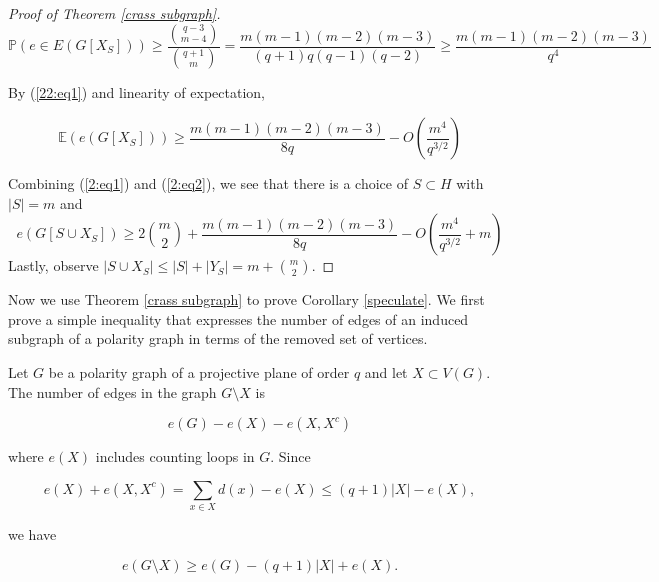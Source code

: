 \documentclass[12pt]{article}
\begin{document}
\begin{proof}[Proof of Theorem \ref{crass subgraph}]
    $$ \mathbb{P} ( e \in E (G[  X_S ] ) ) \geq \frac{ \binom{q-3}{m-4} }{ \binom{q+1}{m}} = \frac{ m ( m - 1) ( m - 2)( m - 3) }{ (q + 1) q ( q - 1) ( q- 2) } \geq \frac{ m ( m -1) ( m -2) ( m - 3) }{q^4} $$

    By (\ref{22:eq1}) and linearity of expectation,

    \begin{equation}\label{2:eq2}
        \mathbb{E} ( e (G [ X_S] ) ) \geq \frac{ m ( m - 1)(m-2)(m-3) }{8q} - O \left( \frac{m^4}{q^{3/2}} \right)
    \end{equation}

    Combining (\ref{2:eq1}) and (\ref{2:eq2}), we see that there is a choice of $S \subset H$ with $|S| = m$ and
    $$ e ( G[ S \cup X_S ] ) \geq 2 \binom{ m }{2} + \frac{ m ( m - 1)(m-2)(m-3) }{8q} - O \left( \frac{m^4}{q^{3/2}}+m \right) $$
    Lastly, observe $|S \cup X_S| \leq |S| + |Y_S| = m + \binom{m}{2}$.
\end{proof}

Now we use Theorem \ref{crass subgraph} to prove Corollary \ref{speculate}.  We first prove a simple inequality that
expresses the number of edges of an induced subgraph of a polarity graph in terms of the removed set of vertices.

Let $G$ be a polarity graph of a projective plane of order $q$ and let $X\subset V(G)$.
The number of edges in the graph $G \setminus X$ is

$$ e(G) - e(X) - e(X, X^c) $$

where $e(X)$ includes counting loops in $G$. Since

$$ e(X) + e(X, X^c) = \sum_{x\in X} d(x) - e(X) \leq (q+1)|X| - e(X), $$

we have

\begin{equation}\label{2:eq3}
    e(G \setminus X ) \geq e(G) - (q + 1) |X| + e(X).
\end{equation}
\end{document}
